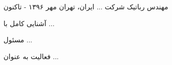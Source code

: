 

\begin{cventries}

  \cventry
    {مهندس رباتیک} %
    {شرکت ...} %
    {ایران، تهران} %
    {مهر ۱۳۹۶ - تاکنون} %
    {
      \begin{cvitems} %
        \item {آشنایی کامل با ...}
        \item {مسئول ... }
        \item {فعالیت به عنوان ...}
      \end{cvitems}
    }

  
\end{cventries}
